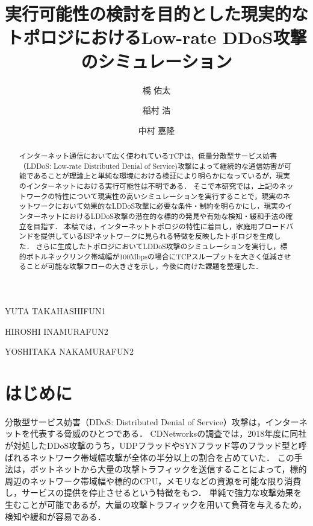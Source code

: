 \documentclass[Japanese]{dicomopapers}
\begin{document}
\title{実行可能性の検討を目的とした現実的なトポロジにおけるLow-rate DDoS攻撃のシミュレーション}



\author{橋 佑太}{YUTA TAKAHASHI}{FUN1}
\author{稲村 浩}{HIROSHI INAMURA}{FUN2}
\author{中村 嘉隆}{YOSHITAKA NAKAMURA}{FUN2}

\begin{abstract}
インターネット通信において広く使われているTCPは，低量分散型サービス妨害（LDDoS: Low-rate Distributed Denial of Service)攻撃によって継続的な通信妨害が可能であることが理論上と単純な環境における検証により明らかになっているが，現実のインターネットにおける実行可能性は不明である．
そこで本研究では，上記のネットワークの特性について現実性の高いシミュレーションを実行することで，現実のネットワークにおいて効果的なLDDoS攻撃に必要な条件・制約を明らかにし，現実のインターネットにおけるLDDoS攻撃の潜在的な標的の発見や有効な検知・緩和手法の確立を目指す．
本稿では，インターネットトポロジの特性に着目し，家庭用ブロードバンドを提供しているISPネットワークに見られる特徴を反映したトポロジを生成した．
さらに生成したトポロジにおいてLDDoS攻撃のシミュレーションを実行し，標的ボトルネックリンク帯域幅が100Mbpsの場合にTCPスループットを大きく低減させることが可能な攻撃フローの大きさを示し，今後に向けた課題を整理した．
\end{abstract}

\maketitle

\section{はじめに}
分散型サービス妨害（DDoS: Distributed Denial of Service）攻撃は，インターネットを代表する脅威のひとつである．
CDNetworksの調査では，2018年度に同社が対処したDDoS攻撃のうち，UDPフラッドやSYNフラッド等のフラッド型と呼ばれるネットワーク帯域幅攻撃が全体の半分以上の割合を占めていた\cite{cdn}．
この手法は，ボットネットから大量の攻撃トラフィックを送信することによって，標的周辺のネットワーク帯域幅や標的のCPU，メモリなどの資源を可能な限り消費し，サービスの提供を停止させるという特徴をもつ．
単純で強力な攻撃効果を生むことが可能であるが，大量の攻撃トラフィックを用いて負荷を与えるため，検知や緩和が容易である．
\end{document}
